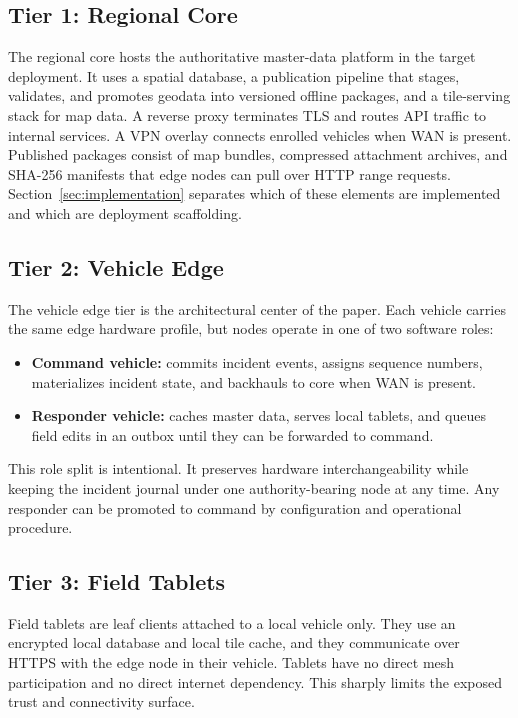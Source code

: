 \subsection{Tier 1: Regional Core}

The regional core hosts the authoritative master-data platform in the target deployment. It uses a spatial database, a publication pipeline that stages, validates, and promotes geodata into versioned offline packages, and a tile-serving stack for map data. A reverse proxy terminates TLS and routes API traffic to internal services. A VPN overlay connects enrolled vehicles when WAN is present. Published packages consist of map bundles, compressed attachment archives, and SHA-256 manifests that edge nodes can pull over HTTP range requests. Section~\ref{sec:implementation} separates which of these elements are implemented and which are deployment scaffolding.

\subsection{Tier 2: Vehicle Edge}

The vehicle edge tier is the architectural center of the paper. Each vehicle carries the same edge hardware profile, but nodes operate in one of two software roles:
\begin{itemize}
  \item \textbf{Command vehicle:} commits incident events, assigns sequence numbers, materializes incident state, and backhauls to core when WAN is present.
  \item \textbf{Responder vehicle:} caches master data, serves local tablets, and queues field edits in an outbox until they can be forwarded to command.
\end{itemize}

This role split is intentional. It preserves hardware interchangeability while keeping the incident journal under one authority-bearing node at any time. Any responder can be promoted to command by configuration and operational procedure.

\subsection{Tier 3: Field Tablets}

Field tablets are leaf clients attached to a local vehicle only. They use an encrypted local database and local tile cache, and they communicate over HTTPS with the edge node in their vehicle. Tablets have no direct mesh participation and no direct internet dependency. This sharply limits the exposed trust and connectivity surface.

